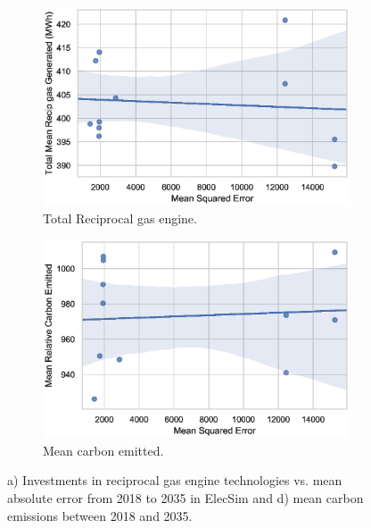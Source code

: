 \begin{figure}[h!]
\centering
\begin{subfigure}[b]{0.33\textwidth}   
\includegraphics[width=\columnwidth]{Chapter5/figures/market-forecasting/results/elecsim_results/results_2/total_Recip_gas_mean_output.eps}
\caption{Total Reciprocal gas engine.}
\label{fig:total_Recip_gas_mean_output.eps}
\end{subfigure}
\hfil
\begin{subfigure}[b]{0.33\textwidth}   
\includegraphics[width=\columnwidth]{Chapter5/figures/market-forecasting/results/elecsim_results/results_2/Carbon_emitted_mean_output.eps}
\caption{Mean carbon emitted.}
\label{fig:Carbon_emitted_mean_output}
\end{subfigure}
\label{fig:nuclear_pv_carbon_totals}
\caption{a) Investments in reciprocal gas engine technologies vs. mean absolute error from 2018 to 2035 in ElecSim and d) mean carbon emissions between 2018 and 2035.}
\end{figure}






